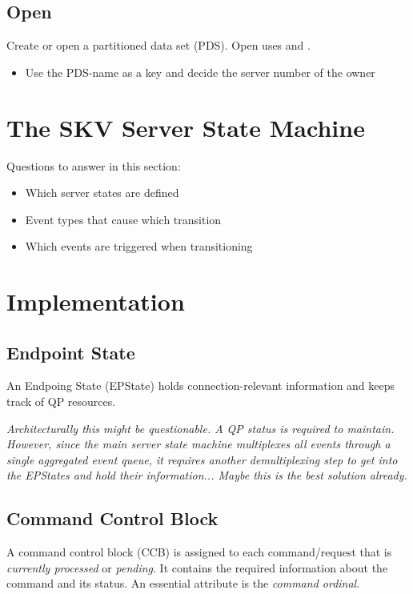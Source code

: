 \subsection{Open}
Create or open a partitioned data set (PDS).  Open uses  and .
\begin{itemize}
\item Use the PDS-name as a key and decide the server number of the owner
\end{itemize}




\section{The SKV Server State Machine}\label{sec:skv:srv_sm}

Questions to answer in this section:
\begin{itemize}
\item Which server states are defined
\item Event types that cause which transition
\item Which events are triggered when transitioning
\end{itemize}


\section{Implementation}\label{sec:skv:impl}

\subsection{Endpoint State}
An Endpoing State (EPState) holds connection-relevant information and
keeps track of QP resources.

\emph{Architecturally this might be questionable. A QP status is
  required to maintain. However, since the main server state machine
  multiplexes all events through a single aggregated event queue, it
  requires another demultiplexing step to get into the EPStates and
  hold their information... Maybe this is the best solution already. }



\subsection{Command Control Block}
A command control block (CCB) is assigned to each command/request that is
\emph{currently processed} or \emph{pending}. It contains the required
information about the command and its status.
An essential attribute is the \emph{command ordinal}.

